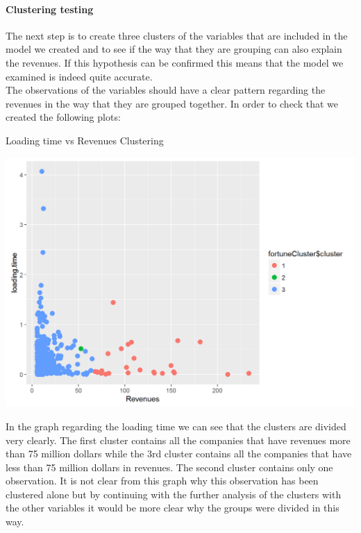 \documentclass{article}
\begin{document}
\paragraph{Clustering testing}
The next step is to create three clusters of the variables that are included in the model we created and to see if the way that they are grouping can also explain the revenues. If this hypothesis can be confirmed this means that the model we examined is indeed quite accurate.\\
The observations of the variables should have a clear pattern regarding the revenues in the way that they are grouped together. In order to check that we created the following plots:
\begin{table}[H]
\centering
\caption{Loading time vs Revenues Clustering}
\begin{center}
\includegraphics[scale=0.6]{../R/photos/91_clust_ld.png}   \\
\end{center}
\end{table}
In the graph regarding the loading time we can see that the clusters are divided very clearly. The first cluster contains all the companies that have revenues more than 75 million dollars while the 3rd cluster contains all the companies that have less than 75 million dollars in revenues. The second cluster contains only one observation. It is not clear from this graph why this observation has been clustered alone but by continuing with the further analysis of the clusters with the other variables it would be more clear why the groups were divided in this way.
\end{document}
